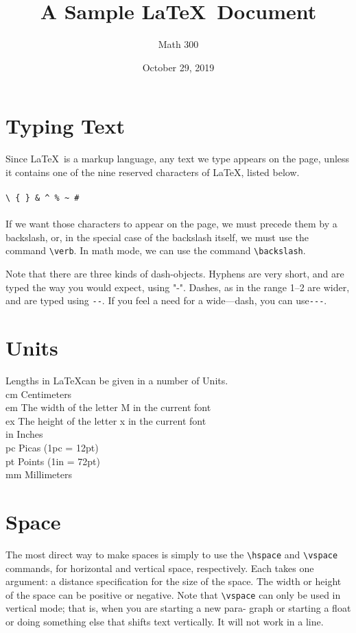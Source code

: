 \documentclass[12pt]{article}
\title{A Sample \LaTeX \ Document}
\author{Math 300}
\date{October 29, 2019}
\begin{document}
	\maketitle
	\section{Typing Text}
	Since \LaTeX \ is a markup language, any text we type appears on the page,
	unless it contains one of the nine reserved characters of \LaTeX, listed below.\\\\
	\verb|\ { } & ^ % ~ #|\\\\
	If we want those characters to appear on the page, we must precede them by a backslash, or, in the special case of the backslash itself, we must use the command \verb|\verb|. In math mode, we can use the command \verb|\backslash|.
	
	
	Note that there are three kinds of dash-objects. Hyphens are very short, and are typed the way you would expect, using "-". Dashes, as in the range 1--2 are wider, and are typed using \verb|--|. If you feel a need for a wide---dash, you can use\verb|---|.
	
	\section{Units}
	Lengths in \LaTeX can be given in a number of Units.\\
	\hphantom{\space}cm\hphantom{\space\space\space} Centimeters\\
	\hphantom{\space}em\hphantom{\space\space\space} The width of the letter M in the current font\\
	\hphantom{\space}ex\hphantom{\space\space\space\space} The height of the letter x in the current font\\
	\hphantom{\space}in\hphantom{\space\space\space\space\space} Inches\\
	\hphantom{\space}pc\hphantom{\space\space\space\space} Picas (1pc = 12pt)\\
	\hphantom{\space}pt\hphantom{\space\space\space\space} Points (1in = 72pt)\\
	\hphantom{\space}mm\hphantom{\space\space} Millimeters\\
	
	\section{Space}
	The most direct way to make spaces is simply to use the \verb|\hspace| and
	\verb|\vspace| commands, for horizontal and vertical space, respectively. Each
	takes one argument: a distance specification for the size of the space. The
	width or height of the space can be positive or negative. Note that \verb|\vspace|
	can only be used in vertical mode; that is, when you are starting a new para-
	graph or starting a float or doing something else that shifts text vertically.
	It will not work in a line.
	
\end{document}
